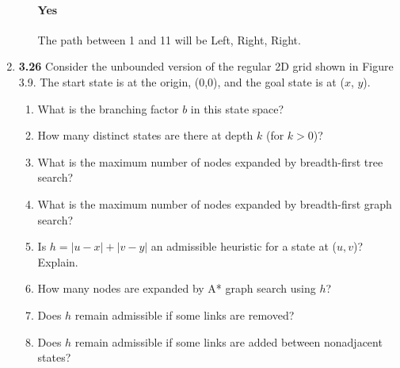 \documentclass[12pt]{article}
\begin{document}
\begin{enumerate}
\begin{enumerate}
  \paragraph{Yes} The path between 1 and 11 will be Left, Right, Right.
  \end{enumerate}

\item \textbf{3.26} Consider the unbounded version of the regular 2D grid shown in Figure 3.9. The start state is at the origin, (0,0), and the goal state is at ($x$, $y$).
  \begin{enumerate}
  \item What is the branching factor $b$ in this state space?
  \item How many distinct states are there at depth $k$ (for $k > 0$)?
  \item What is the maximum number of nodes expanded by breadth-first tree search?
  \item What is the maximum number of nodes expanded by breadth-first graph search?
  \item Is $h = \left|u - x\right| + \left|v - y\right|$ an admissible heuristic for a state at ($u, v$)? Explain.
  \item How many nodes are expanded by A* graph search using $h$?
  \item Does $h$ remain admissible if some links are removed?
  \item Does $h$ remain admissible if some links are added between nonadjacent states?
  \end{enumerate}

\end{enumerate}
\end{document}
